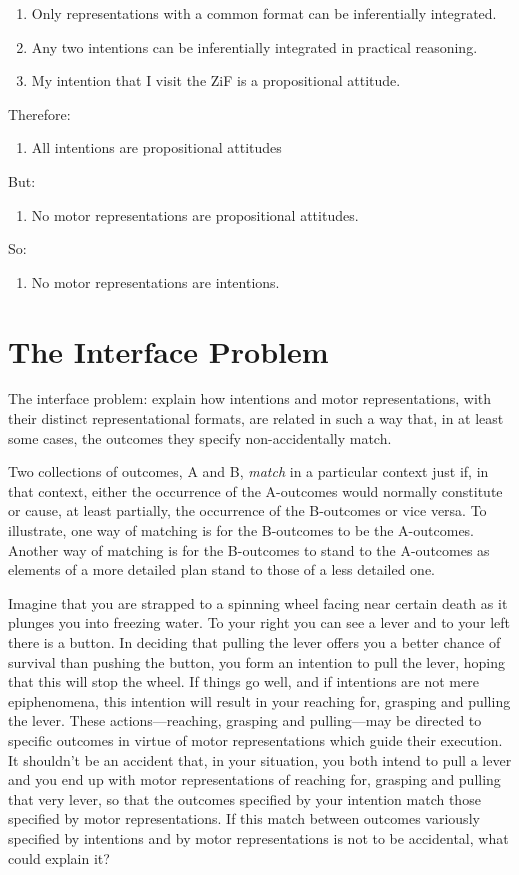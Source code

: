 \documentclass[12pt]{extarticle}
\begin{document}
\begin{multicols*}{3}
\begin{enumerate}
\item Only representations with a common format can be inferentially integrated.
\item Any two intentions can be inferentially integrated in practical reasoning.
\item My intention that I visit the ZiF is a propositional attitude.
\end{enumerate}
Therefore:
\begin{enumerate}[resume]
\item  All intentions are propositional attitudes
\end{enumerate}
But:
\begin{enumerate}[resume]
\item No motor representations are propositional attitudes.
\end{enumerate}
So:
\begin{enumerate}[resume]
\item No motor representations are intentions.
\end{enumerate}



\section{The Interface Problem}

The interface problem: explain how intentions and motor representations, with their distinct
representational formats, are related in such a way that, in at least some cases, the outcomes they
specify non-accidentally match.

Two collections of outcomes, A and B, \emph{match} in a particular context just if, in that context,
either the occurrence of the A-outcomes would normally constitute or cause, at least partially, the
occurrence of the B-outcomes or vice versa. To illustrate, one way of matching is for the B-outcomes
to be the A-outcomes. Another way of matching is for the B-outcomes to stand to the A-outcomes as
elements of a more detailed plan stand to those of a less detailed one.


Imagine that you are strapped to a spinning wheel facing near certain death as it plunges you into
freezing water. To your right you can see a lever and to your left there is a button. In deciding
that pulling the lever offers you a better chance of survival than pushing the button, you form an
intention to pull the lever, hoping that this will stop the wheel. If things go well, and if
intentions are not mere epiphenomena, this intention will result in your reaching for, grasping and
pulling the lever. These actions---reaching, grasping and pulling---may be directed to specific
outcomes in virtue of motor representations which guide their execution. It shouldn't be an accident
that, in your situation, you both intend to pull a lever and you end up with motor representations
of reaching for, grasping and pulling that very lever, so that the outcomes specified by your
intention match those specified by motor representations. If this match between outcomes variously
specified by intentions and by motor representations is not to be accidental, what could explain it?


\end{multicols*}
\end{document}
